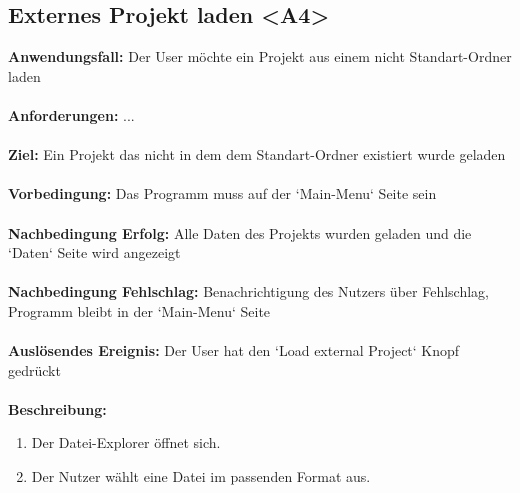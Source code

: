 \documentclass[parskip=full]{scrartcl} %
\begin{document}
\subsection*{Externes Projekt laden <A4>}
\textbf{Anwendungsfall:} Der User möchte ein Projekt aus einem nicht Standart-Ordner laden\\\\
\textbf{Anforderungen:} ...\\\\
\textbf{Ziel:} Ein Projekt das nicht in dem dem Standart-Ordner existiert wurde geladen \\\\
\textbf{Vorbedingung:} Das Programm muss auf der `Main-Menu` Seite sein  \\\\
\textbf{Nachbedingung Erfolg:} Alle Daten des Projekts wurden geladen und die `Daten` Seite wird angezeigt \\\\
\textbf{Nachbedingung Fehlschlag:} Benachrichtigung des Nutzers über Fehlschlag, Programm  bleibt in der `Main-Menu` Seite \\\\
\textbf{Auslösendes Ereignis:}  Der User hat den `Load external Project` Knopf gedrückt \\\\
\textbf{Beschreibung:}
\begin{enumerate}
    \item Der Datei-Explorer öffnet sich.
    \item Der Nutzer wählt eine Datei im passenden Format aus.
\end{enumerate}
\newpage
\end{document}
